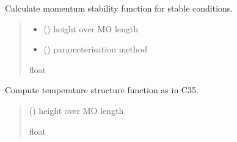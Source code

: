 \documentclass[letterpaper,10pt,english]{sphinxmanual}
\begin{document}

\begin{fulllineitems}
\label{\detokenize{users_guide:AirSeaFluxCode.flux_subs.stratification.psim_stab}}
\pysigstartsignatures
{}
\pysigstopsignatures
\sphinxAtStartPar
Calculate momentum stability function for stable conditions.
\begin{quote}\begin{description}
\begin{itemize}
\item {} 
\sphinxAtStartPar
{} () \textendash{} height over MO length

\item {} 
\sphinxAtStartPar
{} () \textendash{} parameterisation method

\end{itemize}

\sphinxAtStartPar
{}

\sphinxAtStartPar
float

\end{description}\end{quote}

\end{fulllineitems}


\begin{fulllineitems}
\label{\detokenize{users_guide:AirSeaFluxCode.flux_subs.stratification.psit_26}}
\pysigstartsignatures
{}
\pysigstopsignatures
\sphinxAtStartPar
Compute temperature structure function as in C35.
\begin{quote}\begin{description}
\sphinxAtStartPar
{} () \textendash{} height over MO length

\sphinxAtStartPar
{}

\sphinxAtStartPar
float

\end{description}\end{quote}

\end{fulllineitems}
\end{document}
